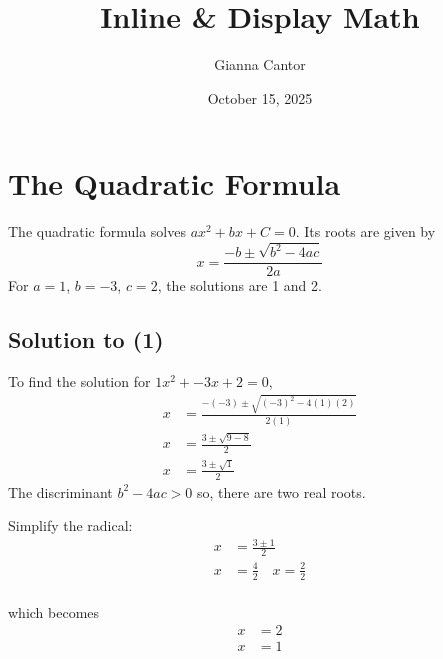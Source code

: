 \documentclass{article}
\title{Inline \& Display Math}
\author{Gianna Cantor}
\date{October 15, 2025}
\begin{document}
\maketitle

\section{The Quadratic Formula}
The quadratic formula solves $ax^2 + bx + C = 0$. Its roots are given by
    \begin{equation} \label{equation1}
        x = \frac{-b\pm\sqrt{b^2 - 4ac}}{2a}
    \end{equation}
For $a = 1$, $b = -3$, $c = 2$, the solutions are 1 and 2. 

\subsection{Solution to (1)}
To find the solution for $1x^2 + -3x + 2 = 0$,
    \begin{equation*}
    \begin{split}
        x & = \frac{-(-3)\pm\sqrt{(-3)^2 - 4(1)(2)}}{2(1)} \\
        x & = \frac{3\pm\sqrt{9 - 8}}{2} \\
        x & = \frac{3\pm\sqrt{1}}{2}
    \end{split}
    \end{equation*}
The discriminant $b^2 - 4ac > 0 $ so, there are two real roots.

Simplify the radical:
    \begin{equation*}
    \begin{split}
        x & = \frac{3 \pm 1}{2} \\
        x & = \frac{4}{2} \quad x = \frac{2}{2} \\
    \end{split}
    \end{equation*}

which becomes
    \begin{equation*}
    \begin{split}
        x & = 2 \\
        x & = 1
    \end{split}
    \end{equation*}
\end{document}
